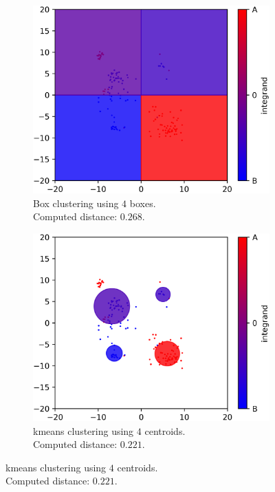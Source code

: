 \begin{modified}
\begin{figure}[p]
	\centering
	\begin{subfigure}{0.48\linewidth}
		\includegraphics[width=\linewidth]{Figures/box_comparison.png}
		\caption[Box clustering, example of comparison]{Box clustering using $4$ boxes.\\ Computed distance: $0.268$.}
		\label{fig:box_clustering}
	\end{subfigure}
	\hfill
	\begin{subfigure}{0.48\linewidth}
		\includegraphics[width=\linewidth]{Figures/kmeans_comparison.png}
		\caption[\gls{kmeans} clustering, example of comparison]{\gls{kmeans} clustering using $4$ centroids.\\ Computed distance: $0.221$.}

\end{subfigure}
\end{figure}
\end{modified}
